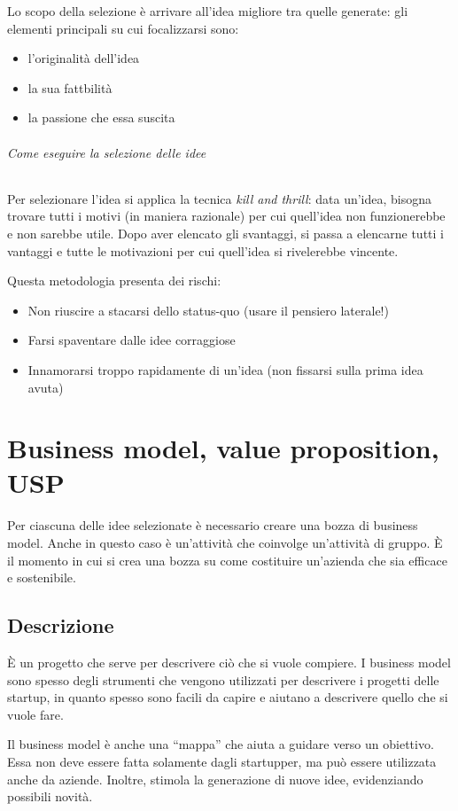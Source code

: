 Lo scopo della selezione è arrivare all'idea migliore tra quelle generate: gli
elementi principali su cui focalizzarsi sono:
\begin{itemize}
 \item l'originalità dell'idea
 \item la sua fattbilità
 \item la passione che essa suscita
\end{itemize}

\subparagraph*{Come eseguire la selezione delle idee} Per selezionare l'idea si
applica la tecnica \textit{kill and thrill}: data un'idea, bisogna trovare
tutti i motivi (in maniera razionale) per cui quell'idea non funzionerebbe e
non sarebbe utile. Dopo aver elencato gli svantaggi, si passa a elencarne tutti
i vantaggi e tutte le motivazioni per cui quell'idea si rivelerebbe vincente.

Questa metodologia presenta dei rischi:
\begin{itemize}
 \item Non riuscire a stacarsi dello status-quo (usare il pensiero laterale!)
 \item Farsi spaventare dalle idee corraggiose
 \item Innamorarsi troppo rapidamente di un'idea (non fissarsi sulla prima idea
avuta)
\end{itemize}

\chapter{Business model, value proposition, USP}

Per ciascuna delle idee selezionate è necessario creare una bozza di business
model. Anche in questo caso è un'attività che coinvolge un'attività di gruppo. È
il momento in cui si crea una bozza su come costituire un'azienda che sia
efficace e sostenibile.

\section{Descrizione}

È un progetto che serve per descrivere ciò che si vuole compiere. I business
model sono spesso degli strumenti che vengono utilizzati per descrivere i
progetti delle startup, in quanto spesso sono facili da capire e aiutano a
descrivere quello che si vuole fare.

Il business model è anche una ``mappa'' che aiuta a guidare verso un obiettivo.
Essa non deve essere fatta solamente dagli startupper, ma può essere utilizzata
anche da aziende. Inoltre, stimola la generazione di nuove idee, evidenziando
possibili novità.

